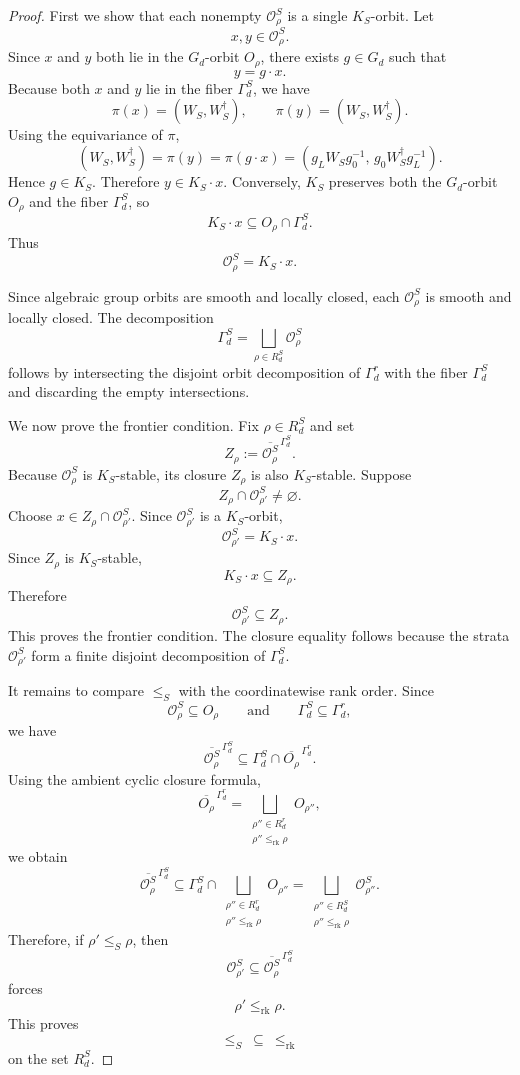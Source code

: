 \documentclass[11pt]{article}
\theoremstyle{definition}
\begin{document}
\begin{proof}
First we show that each nonempty \(\mathcal O_\rho^S\) is a single
\(K_S\)-orbit. Let
\[
x,y\in \mathcal O_\rho^S.
\]
Since \(x\) and \(y\) both lie in the \(G_d\)-orbit \(O_\rho\), there exists
\(g\in G_d\) such that
\[
y=g\cdot x.
\]
Because both \(x\) and \(y\) lie in the fiber \(\Gamma_d^S\), we have
\[
\pi(x)=(W_S,W_S^{\dagger}),
\qquad
\pi(y)=(W_S,W_S^{\dagger}).
\]
Using the equivariance of \(\pi\),
\[
(W_S,W_S^{\dagger})
=
\pi(y)
=
\pi(g\cdot x)
=
(g_L W_Sg_0^{-1},\,g_0 W_S^{\dagger}g_L^{-1}).
\]
Hence \(g\in K_S\). Therefore \(y\in K_S\cdot x\). Conversely, \(K_S\)
preserves both the \(G_d\)-orbit \(O_\rho\) and the fiber \(\Gamma_d^S\), so
\[
K_S\cdot x\subseteq O_\rho\cap\Gamma_d^S.
\]
Thus
\[
\mathcal O_\rho^S=K_S\cdot x.
\]

Since algebraic group orbits are smooth and locally closed, each
\(\mathcal O_\rho^S\) is smooth and locally closed. The decomposition
\[
\Gamma_d^S
=
\bigsqcup_{\rho\in R_d^S}\mathcal O_\rho^S
\]
follows by intersecting the disjoint orbit decomposition of \(\Gamma_d^r\) with
the fiber \(\Gamma_d^S\) and discarding the empty intersections.

We now prove the frontier condition. Fix \(\rho\in R_d^S\) and set
\[
Z_\rho
:=
\overline{\mathcal O_\rho^S}^{\,\Gamma_d^S}.
\]
Because \(\mathcal O_\rho^S\) is \(K_S\)-stable, its closure \(Z_\rho\) is also
\(K_S\)-stable. Suppose
\[
Z_\rho\cap \mathcal O_{\rho'}^S\neq\varnothing.
\]
Choose \(x\in Z_\rho\cap \mathcal O_{\rho'}^S\). Since
\(\mathcal O_{\rho'}^S\) is a \(K_S\)-orbit,
\[
\mathcal O_{\rho'}^S=K_S\cdot x.
\]
Since \(Z_\rho\) is \(K_S\)-stable,
\[
K_S\cdot x\subseteq Z_\rho.
\]
Therefore
\[
\mathcal O_{\rho'}^S\subseteq Z_\rho.
\]
This proves the frontier condition. The closure equality follows because the
strata \(\mathcal O_{\rho'}^S\) form a finite disjoint decomposition of
\(\Gamma_d^S\).

It remains to compare \(\leq_S\) with the coordinatewise rank order. Since
\[
\mathcal O_\rho^S\subseteq O_\rho
\qquad
\text{and}
\qquad
\Gamma_d^S\subseteq \Gamma_d^r,
\]
we have
\[
\overline{\mathcal O_\rho^S}^{\,\Gamma_d^S}
\subseteq
\Gamma_d^S\cap \overline{O_\rho}^{\,\Gamma_d^r}.
\]
Using the ambient cyclic closure formula,
\[
\overline{O_\rho}^{\,\Gamma_d^r}
=
\bigsqcup_{\substack{\rho''\in R_d^r\\ \rho''\leq_{\mathrm{rk}}\rho}}
O_{\rho''},
\]
we obtain
\[
\overline{\mathcal O_\rho^S}^{\,\Gamma_d^S}
\subseteq
\Gamma_d^S
\cap
\bigsqcup_{\substack{\rho''\in R_d^r\\ \rho''\leq_{\mathrm{rk}}\rho}}
O_{\rho''}
=
\bigsqcup_{\substack{\rho''\in R_d^S\\ \rho''\leq_{\mathrm{rk}}\rho}}
\mathcal O_{\rho''}^S.
\]
Therefore, if \(\rho'\leq_S\rho\), then
\[
\mathcal O_{\rho'}^S
\subseteq
\overline{\mathcal O_\rho^S}^{\,\Gamma_d^S}
\]
forces
\[
\rho'\leq_{\mathrm{rk}}\rho.
\]
This proves
\[
\leq_S\ \subseteq\ \leq_{\mathrm{rk}}
\]
on the set \(R_d^S\).
\end{proof}
\end{document}
